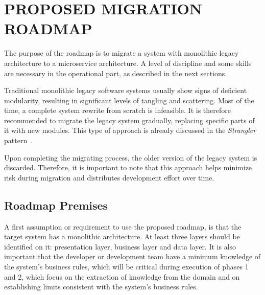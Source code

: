 \documentclass[a4paper,twoside]{article}
\begin{document}
\section{\uppercase{Proposed Migration Roadmap}}
\label{sec:migrationroadmap}

The purpose of the roadmap is to migrate a system with monolithic legacy architecture to a microservice architecture. A level of discipline and some skills are necessary in the operational part, as described in the next sections.


Traditional monolithic legacy software systems usually show signs of deficient modularity, resulting in significant levels of tangling and scattering. Most of the time, a complete system rewrite from scratch is infeasible. It is therefore recommended to migrate the legacy system gradually, replacing specific parts of it with new modules. This type of approach is already discussed in the \textit{Strangler} pattern~\cite{taibi2017processes}.

Upon completing the migrating process, the older version of the legacy system is discarded. Therefore, it is important to note that this approach helps minimize risk during migration and distributes development effort over time.

\subsection{Roadmap Premises}

A first assumption or requirement to use the proposed roadmap, is that the target system has a monolithic architecture. At least three layers should be identified on it: presentation layer, business layer and data layer. It is also important that the developer or development team have a minimum knowledge of the system's business rules, which will be critical during execution of phases 1 and 2, which focus on the extraction of knowledge from the domain and on establishing limits consistent with the system's business rules.
\end{document}
